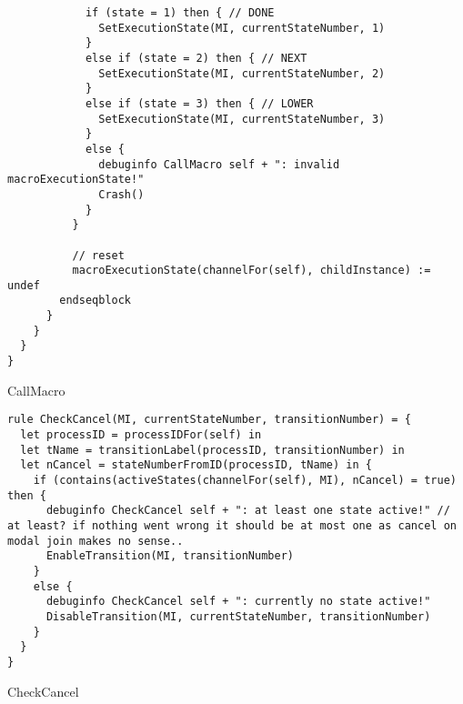 \begin{listing}[H]
\begin{verbatim}
            if (state = 1) then { // DONE
              SetExecutionState(MI, currentStateNumber, 1)
            }
            else if (state = 2) then { // NEXT
              SetExecutionState(MI, currentStateNumber, 2)
            }
            else if (state = 3) then { // LOWER
              SetExecutionState(MI, currentStateNumber, 3)
            }
            else {
              debuginfo CallMacro self + ": invalid macroExecutionState!"
              Crash()
            }
          }

          // reset
          macroExecutionState(channelFor(self), childInstance) := undef
        endseqblock
      }
    }
  }
}
\end{verbatim}
\caption{CallMacro}
\label{lst:asm:CallMacro}
\end{listing}




\begin{listing}[H]
\begin{verbatim}
rule CheckCancel(MI, currentStateNumber, transitionNumber) = {
  let processID = processIDFor(self) in
  let tName = transitionLabel(processID, transitionNumber) in
  let nCancel = stateNumberFromID(processID, tName) in {
    if (contains(activeStates(channelFor(self), MI), nCancel) = true) then {
      debuginfo CheckCancel self + ": at least one state active!" // at least? if nothing went wrong it should be at most one as cancel on modal join makes no sense..
      EnableTransition(MI, transitionNumber)
    }
    else {
      debuginfo CheckCancel self + ": currently no state active!"
      DisableTransition(MI, currentStateNumber, transitionNumber)
    }
  }
}
\end{verbatim}
\caption{CheckCancel}
\label{lst:asm:CheckCancel}
\end{listing}




